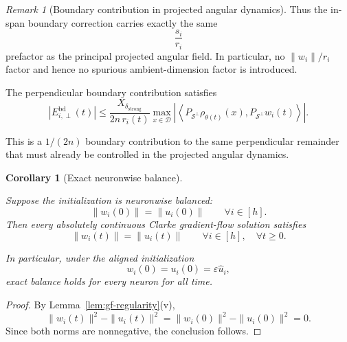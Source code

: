 \documentclass{article} %
\theoremstyle{plain}
\newtheorem{corollary}[theorem]{Corollary}
\theoremstyle{definition}
\theoremstyle{remark}
\newtheorem{remark}[theorem]{Remark}
\begin{document}
\begin{remark}[Boundary contribution in projected angular dynamics]
Thus the in-span boundary correction carries exactly the same
\[
\frac{s_i}{r_i}
\]
prefactor as the principal projected angular field. In particular, no
$\|w_i\|/r_i$ factor and hence no spurious ambient-dimension factor is
introduced.

The perpendicular boundary contribution satisfies
\[
\boxed{
|E_{i,\perp}^{\mathrm{bd}}(t)|
\le
\frac{X_{\delta_{\mathrm{strong}}}}{2n\,r_i(t)}
\max_{x\in\mathcal D}
\left|
\left\langle
P_{\mathcal S^\perp}\rho_{\theta(t)}(x),
P_{\mathcal S^\perp}w_i(t)
\right\rangle
\right|.
}
\]

This is a $1/(2n)$ boundary contribution to the same perpendicular remainder
that must already be controlled in the projected angular dynamics.
\end{remark}



\begin{corollary}[Exact neuronwise balance]
\label{cor:exact-balance}

Suppose the initialization is neuronwise balanced:
\[
\|w_i(0)\|
=
\|u_i(0)\|
\qquad
\forall i\in[h].
\]
Then every absolutely continuous Clarke gradient-flow solution satisfies
\[
\boxed{
\|w_i(t)\|
=
\|u_i(t)\|
}
\qquad
\forall i\in[h],
\quad
\forall t\ge0.
\]

In particular, under the aligned initialization
\[
w_i(0)
=
u_i(0)
=
\varepsilon\widehat u_i,
\]
exact balance holds for every neuron for all time.
\end{corollary}

\begin{proof}
By Lemma~\ref{lem:gf-regularity}\textnormal{(v)},
\[
\|w_i(t)\|^2-\|u_i(t)\|^2
=
\|w_i(0)\|^2-\|u_i(0)\|^2
=
0.
\]
Since both norms are nonnegative, the conclusion follows.
\end{proof}


\end{document}

